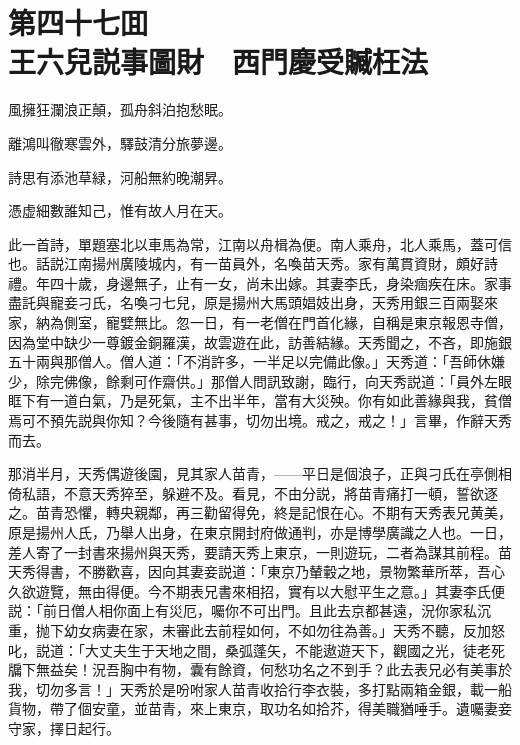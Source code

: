 
\chapter*{第四十七囬　\\王六兒説事圖財　西門慶受贓枉法}


\begin{myquote}
風擁狂瀾浪正顛，孤舟斜泊抱愁眠。

離鴻叫徹寒雲外，驛鼓清分旅夢邊。

詩思有添池草緑，河船無約晚潮昇。

憑虚細數誰知己，惟有故人月在天。
\end{myquote}

此一首詩，單題塞北以車馬為常，江南以舟楫為便。南人乘舟，北人乘馬，蓋可信也。話説江南揚州廣陵城内，有一苗員外，名喚苗天秀。家有萬貫資財，頗好詩禮。年四十歲，身邊無子，止有一女，尚未出嫁。其妻李氏，身染痼疾在床。家事盡託與寵妾刁氏，名喚刁七兒，原是揚州大馬頭娼妓出身，天秀用銀三百兩娶來家，納為側室，寵嬖無比。忽一日，有一老僧在門首化緣，自稱是東京報恩寺僧，因為堂中缺少一尊鍍金銅羅漢，故雲遊在此，訪善結緣。天秀聞之，不吝，即施銀五十兩與那僧人。僧人道：「不消許多，一半足以完備此像。」天秀道：「吾師休嫌少，除完佛像，餘剩可作齋供。」那僧人問訊致謝，臨行，向天秀説道：「員外左眼眶下有一道白氣，乃是死氣，主不出半年，當有大災殃。你有如此善緣與我，貧僧焉可不預先説與你知？今後隨有甚事，切勿出境。戒之，戒之！」言畢，作辭天秀而去。

那消半月，天秀偶遊後園，見其家人苗青，——平日是個浪子，正與刁氏在亭側相倚私語，不意天秀猝至，躲避不及。看見，不由分説，將苗青痛打一頓，誓欲逐之。苗青恐懼，轉央親鄰，再三勸留得免，終是記恨在心。不期有天秀表兄黄美，原是揚州人氏，乃舉人出身，在東京開封府做通判，亦是博學廣識之人也。一日，差人寄了一封書來揚州與天秀，要請天秀上東京，一則遊玩，二者為謀其前程。苗天秀得書，不勝歡喜，因向其妻妾説道：「東京乃輦轂之地，景物繁華所萃，吾心久欲遊覽，無由得便。今不期表兄書來相招，實有以大慰平生之意。」其妻李氏便説：「前日僧人相你面上有災厄，囑你不可出門。且此去京都甚遠，況你家私沉重，抛下幼女病妻在家，未審此去前程如何，不如勿往為善。」天秀不聽，反加怒叱，説道：「大丈夫生于天地之間，桑弧蓬矢，不能遨遊天下，觀國之光，徒老死牖下無益矣！況吾胸中有物，囊有餘資，何愁功名之不到手？此去表兄必有美事於我，切勿多言！」天秀於是吩咐家人苗青收拾行李衣裝，多打點兩箱金銀，載一船貨物，帶了個安童，並苗青，來上東京，取功名如拾芥，得美職猶唾手。遺囑妻妾守家，擇日起行。

